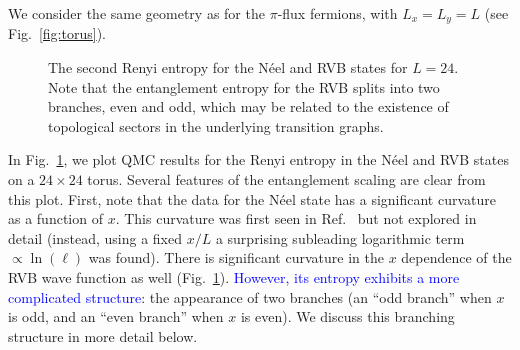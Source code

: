 \documentclass[prl,aps,twocolumn,floatfix,amsmath,amssymb,superscriptaddress,tightenlines]{revtex4}
\begin{document}
We consider the same geometry as for the $\pi$-flux fermions, with $L_x=L_y=L$ (see Fig.~\ref{fig:torus}).
 \begin{figure}
   \begin{center}
   \end{center}
   \caption{ The second Renyi entropy for the N\'eel and RVB states for $L=24$. Note that the entanglement entropy for the RVB splits into two branches, even and odd, which may be related to the existence of topological sectors in the underlying transition graphs.
   \label{fig:heis_bow} }
 \end{figure}
In Fig.~{\ref{fig:heis_bow}}, we plot QMC results for the Renyi entropy in the N\'eel and RVB states on a $24 \times 24$ torus.  
Several features of the entanglement scaling are clear from this plot.  First, note that the data for the N\'eel state has a significant curvature as a function of $x$.  This curvature was first seen in Ref.~\cite{HeisLog} but not explored in detail (instead, using a fixed $x/L$ a surprising subleading logarithmic term $\propto \ln(\ell)$ was found).
There is significant curvature in the $x$ dependence of the RVB wave function as well  (Fig.~\ref{fig:heis_bow}).  \textcolor{blue}{However, its entropy exhibits a more complicated structure}: the appearance of two branches (an ``odd branch'' when $x$ is odd, and an ``even branch'' when $x$ is even).  We discuss this branching structure in more detail below.
\end{document}
